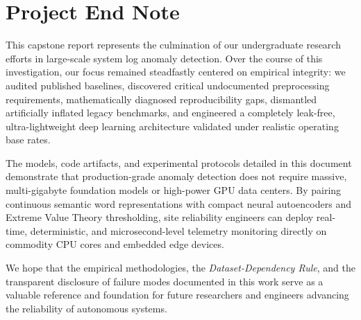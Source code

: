 \vspace{1.0cm}

\section*{Project End Note}

This capstone report represents the culmination of our undergraduate research efforts in large-scale system log anomaly detection. Over the course of this investigation, our focus remained steadfastly centered on empirical integrity: we audited published baselines, discovered critical undocumented preprocessing requirements, mathematically diagnosed reproducibility gaps, dismantled artificially inflated legacy benchmarks, and engineered a completely leak-free, ultra-lightweight deep learning architecture validated under realistic operating base rates.

The models, code artifacts, and experimental protocols detailed in this document demonstrate that production-grade anomaly detection does not require massive, multi-gigabyte foundation models or high-power GPU data centers. By pairing continuous semantic word representations with compact neural autoencoders and Extreme Value Theory thresholding, site reliability engineers can deploy real-time, deterministic, and microsecond-level telemetry monitoring directly on commodity CPU cores and embedded edge devices.

We hope that the empirical methodologies, the \textit{Dataset-Dependency Rule}, and the transparent disclosure of failure modes documented in this work serve as a valuable reference and foundation for future researchers and engineers advancing the reliability of autonomous systems.


